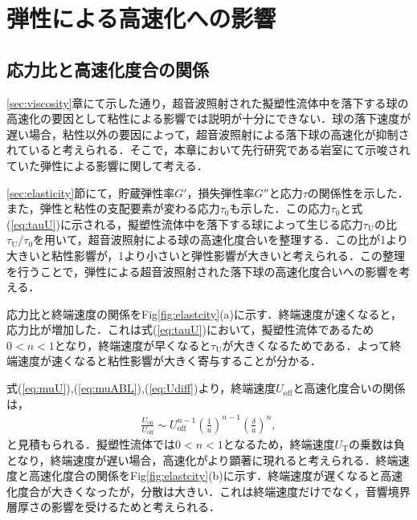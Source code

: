 \section{弾性による高速化への影響}
\label{sec:elasticity-discussion}

\subsection{応力比と高速化度合の関係}
\ref{sec:viscosity}章にて示した通り，超音波照射された擬塑性流体中を落下する球の高速化の要因として粘性による影響では説明が十分にできない．球の落下速度が遅い場合，粘性以外の要因によって，超音波照射による落下球の高速化が抑制されていると考えられる．そこで，本章において先行研究である岩室\cite{ref:8}にて示唆されていた弾性による影響に関して考える．

\ref{sec:elasticity}節にて，貯蔵弾性率$G'$，損失弾性率$G''$と応力$\tau$の関係性を示した．また，弾性と粘性の支配要素が変わる応力$\tau_\text{0}$も示した．この応力$\tau_\text{0}$と式(\ref{eq:tauU})に示される，擬塑性流体中を落下する球によって生じる応力$\tau_\text{U}$の比$\tau_\text{U}/\tau_\text{0}$を用いて，超音波照射による球の高速化度合いを整理する．この比が1より大きいと粘性影響が，1より小さいと弾性影響が大きいと考えられる．この整理を行うことで，弾性による超音波照射された落下球の高速化度合いへの影響を考える．

応力比と終端速度の関係をFig\ref{fig:elastcity}(a)に示す．終端速度が速くなると，応力比が増加した．これは式(\ref{eq:tauU})において，擬塑性流体であるため$0<n<1$となり，終端速度が早くなると$\tau_\text{U}$が大きくなるためである．よって終端速度が速くなると粘性影響が大きく寄与することが分かる．

式(\ref{eq:muU}),(\ref{eq:muABL}),(\ref{eq:Udiff})より，終端速度$U_\text{off}$と高速化度合いの関係は，
\begin{eqnarray}
    \frac{U_\text{on}}{U_\text{off}} \sim U_\text{off}^{n-1} \left(\frac{1}{u}\right)^{n-1} \left(\frac{\delta}{a}\right)^n ,
    \label{eq:UTdiff_UT}
\end{eqnarray}
と見積もられる．擬塑性流体では$0<n<1$となるため，終端速度$U_\text{T}$の乗数は負となり，終端速度が遅い場合，高速化がより顕著に現れると考えられる．終端速度と高速化度合の関係をFig\ref{fig:elastcity}(b)に示す．終端速度が遅くなると高速化度合が大きくなったが，分散は大きい．これは終端速度だけでなく，音響境界層厚さの影響を受けるためと考えられる．

